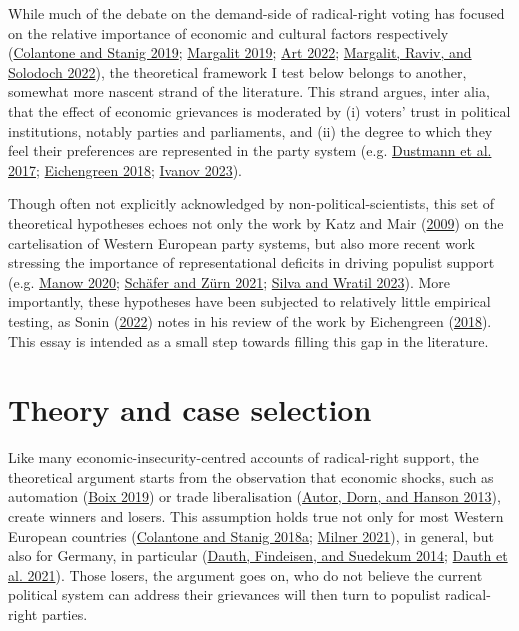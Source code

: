 \documentclass[
]{article}
\begin{document}
While much of the debate on the demand-side of radical-right voting has
focused on the relative importance of economic and cultural factors
respectively (\protect\hyperlink{ref-colantone_surge_2019}{Colantone and
Stanig 2019}; \protect\hyperlink{ref-margalit_economic_2019}{Margalit
2019}; \protect\hyperlink{ref-art_myth_2022}{Art 2022};
\protect\hyperlink{ref-margalit_cultural_2022}{Margalit, Raviv, and
Solodoch 2022}), the theoretical framework I test below belongs to
another, somewhat more nascent strand of the literature. This strand
argues, inter alia, that the effect of economic grievances is moderated
by (i) voters' trust in political institutions, notably parties and
parliaments, and (ii) the degree to which they feel their preferences
are represented in the party system (e.g.
\protect\hyperlink{ref-dustmann_europes_2017}{Dustmann et al. 2017};
\protect\hyperlink{ref-eichengreen_populist_2018}{Eichengreen 2018};
\protect\hyperlink{ref-ivanov_economic_2023}{Ivanov 2023}).

Though often not explicitly acknowledged by non-political-scientists,
this set of theoretical hypotheses echoes not only the work by Katz and
Mair (\protect\hyperlink{ref-katz_cartel_2009}{2009}) on the
cartelisation of Western European party systems, but also more recent
work stressing the importance of representational deficits in driving
populist support (e.g.
\protect\hyperlink{ref-manow_ent-demokratisierung_2020}{Manow 2020};
\protect\hyperlink{ref-schafer_demokratische_2021}{Schäfer and Zürn
2021}; \protect\hyperlink{ref-silva_parties_2023}{Silva and Wratil
2023}). More importantly, these hypotheses have been subjected to
relatively little empirical testing, as Sonin
(\protect\hyperlink{ref-sonin_historical_2022}{2022}) notes in his
review of the work by Eichengreen
(\protect\hyperlink{ref-eichengreen_populist_2018}{2018}). This essay is
intended as a small step towards filling this gap in the literature.

\hypertarget{theory}{%
\section{Theory and case selection}\label{theory}}

Like many economic-insecurity-centred accounts of radical-right support,
the theoretical argument starts from the observation that economic
shocks, such as automation
(\protect\hyperlink{ref-boix_democratic_2019}{Boix 2019}) or trade
liberalisation (\protect\hyperlink{ref-autor_china_2013}{Autor, Dorn,
and Hanson 2013}), create winners and losers. This assumption holds true
not only for most Western European countries
(\protect\hyperlink{ref-colantone_trade_2018}{Colantone and Stanig
2018a}; \protect\hyperlink{ref-milner_voting_2021}{Milner 2021}), in
general, but also for Germany, in particular
(\protect\hyperlink{ref-dauth_rise_2014}{Dauth, Findeisen, and Suedekum
2014}; \protect\hyperlink{ref-dauth_adjustment_2021}{Dauth et al.
2021}). Those losers, the argument goes on, who do not believe the
current political system can address their grievances will then turn to
populist radical-right parties.
\end{document}
